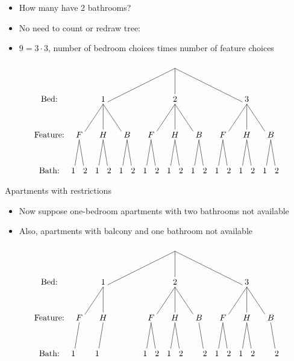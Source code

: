 \documentclass{beamer}
\theoremstyle{definition}
\begin{document}
\begin{frame}
\begin{itemize}
\item How many have 2 bathrooms?
\item No need to count or redraw tree:
\item$ 9=3\cdot 3$, number of bedroom choices times
number of feature choices
\end{itemize}
\[\begin{xy}<.5cm,0cm>:
(8.5,0)="0";
(2.5,-3)="1";
(8.5,-3)="2";
(14.5,-3)="3";
"0";"1"*+!D{1}**\dir{-};
"0";"2"*+!D{2}**\dir{-};
"0";"3"*+!D{3}**\dir{-};
(.5,-6)="11";
(2.5,-6)="12";
(4.5,-6)="13";
(6.5,-6)="21";
(8.5,-6)="22";
(10.5,-6)="23";
(12.5,-6)="31";
(14.5,-6)="32";
(16.5,-6)="33";
"1";"11"*+!D{F}**\dir{-};
"1";"12"*+!D{H}**\dir{-};
"1";"13"*+!D{B}**\dir{-};
"2";"21"*+!D{F}**\dir{-};
"2";"22"*+!D{H}**\dir{-};
"2";"23"*+!D{B}**\dir{-};
"3";"31"*+!D{F}**\dir{-};
"3";"32"*+!D{H}**\dir{-};
"3";"33"*+!D{B}**\dir{-};
"11";(0,-9)*+!D{1}**\dir{-};
"11";(1,-9)*+!D{2}**\dir{-};
"12";(2,-9)*+!D{1}**\dir{-};
"12";(3,-9)*+!D{2}**\dir{-};
"13";(4,-9)*+!D{1}**\dir{-};
"13";(5,-9)*+!D{2}**\dir{-};
"21";(6,-9)*+!D{1}**\dir{-};
"21";(7,-9)*+!D{2}**\dir{-};
"22";(8,-9)*+!D{1}**\dir{-};
"22";(9,-9)*+!D{2}**\dir{-};
"23";(10,-9)*+!D{1}**\dir{-};
"23";(11,-9)*+!D{2}**\dir{-};
"31";(12,-9)*+!D{1}**\dir{-};
"31";(13,-9)*+!D{2}**\dir{-};
"32";(14,-9)*+!D{1}**\dir{-};
"32";(15,-9)*+!D{2}**\dir{-};
"33";(16,-9)*+!D{1}**\dir{-};
"33";(17,-9)*+!D{2}**\dir{-};
(-2,-3)*+!D{\text{Bed:}};
(-2,-6)*+!D{\text{Feature:}};
(-2,-9)*+!D{\text{Bath:}};
\end{xy}\]
\end{frame}

\begin{frame}{Apartments with restrictions}
\begin{itemize}
\item Now suppose one-bedroom apartments with
two bathrooms not available
\item Also, apartments with balcony and one
bathroom not available
\end{itemize}
\[\begin{xy}<.5cm,0cm>:
(8.5,0)="0";
(2.5,-3)="1";
(8.5,-3)="2";
(14.5,-3)="3";
"0";"1"*+!D{1}**\dir{-};
"0";"2"*+!D{2}**\dir{-};
"0";"3"*+!D{3}**\dir{-};
(.5,-6)="11";
(2.5,-6)="12";
(4.5,-6)="13";
(6.5,-6)="21";
(8.5,-6)="22";
(10.5,-6)="23";
(12.5,-6)="31";
(14.5,-6)="32";
(16.5,-6)="33";
"1";"11"*+!D{F}**\dir{-};
"1";"12"*+!D{H}**\dir{-};
"2";"21"*+!D{F}**\dir{-};
"2";"22"*+!D{H}**\dir{-};
"2";"23"*+!D{B}**\dir{-};
"3";"31"*+!D{F}**\dir{-};
"3";"32"*+!D{H}**\dir{-};
"3";"33"*+!D{B}**\dir{-};
"11";(0,-9)*+!D{1}**\dir{-};
"12";(2,-9)*+!D{1}**\dir{-};
"21";(6,-9)*+!D{1}**\dir{-};
"21";(7,-9)*+!D{2}**\dir{-};
"22";(8,-9)*+!D{1}**\dir{-};
"22";(9,-9)*+!D{2}**\dir{-};
"23";(11,-9)*+!D{2}**\dir{-};
"31";(12,-9)*+!D{1}**\dir{-};
"31";(13,-9)*+!D{2}**\dir{-};
"32";(14,-9)*+!D{1}**\dir{-};
"32";(15,-9)*+!D{2}**\dir{-};
"33";(17,-9)*+!D{2}**\dir{-};
(-2,-3)*+!D{\text{Bed:}};
(-2,-6)*+!D{\text{Feature:}};
(-2,-9)*+!D{\text{Bath:}};
\end{xy}\]
\end{frame}
\end{document}
